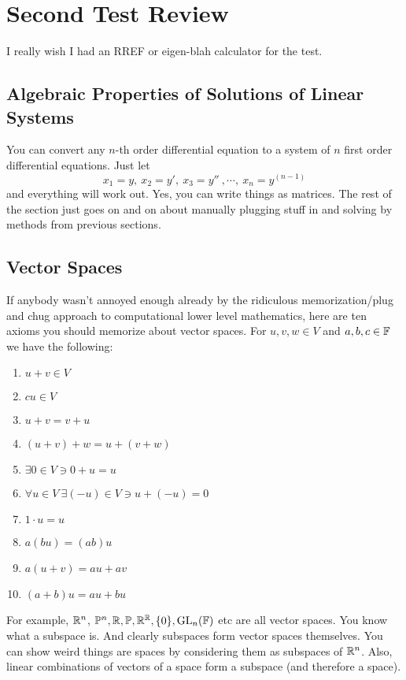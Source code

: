 \section{Second Test Review}
I really wish I had an RREF or eigen-blah calculator for the test.

\subsection{Algebraic Properties of Solutions of Linear Systems}
You can convert any $n$-th order differential equation to a system of $n$ first order differential equations. Just let \[
    x_1=y, \ x_2=y', \ x_3=y'' \ ,  \cdots , \ x_n =y^{(n-1)}
\] and everything will work out. Yes, you can write things as matrices. The rest of the section just goes on and on about manually plugging stuff in and solving by methods from previous sections.

\subsection{Vector Spaces}
If anybody wasn't annoyed enough already by the ridiculous memorization/plug and chug approach to computational lower level mathematics, here are ten axioms you should memorize about vector spaces. For $u,v,w\in V$ and $a,b,c\in \mathbb{F}$ we have the following:
\begin{enumerate}[label=(\roman*)]
    \item $u+v\in V$
    \item $cu\in V$
    \item $u+v=v+u$
    \item $(u+v)+w=u+(v+w)$
    \item  $\exists 0\in V\ni 0+u=u$
    \item $\forall u\in V \ \exists (-u)\in V \ni u+(-u)=0$
    \item $1\cdot u=u$
    \item $a(bu)=(ab)u$
    \item $a(u+v)=au+av$ 
    \item $(a+b)u=au+bu$
\end{enumerate}
For example, $\mathbb{R}^n $, $\mathbb{P}^n, \mathbb{R}, \mathbb{P},\mathbb{R}^{\mathbb{R}},\{0\},\operatorname{GL}_n (\mathbb{F})$ etc are all vector spaces. You know what a subspace is. And clearly subspaces form vector spaces themselves. You can show weird things are spaces by considering them as subspaces of $\mathbb{R}^n $. Also, linear combinations of vectors of a space form a subspace (and therefore a space).

